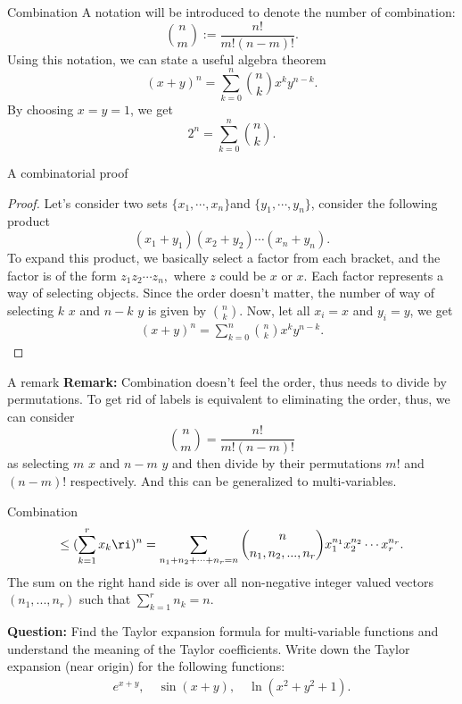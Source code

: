 \begin{frame}{Combination}
A notation will be introduced to denote the number of combination:
\[
\binom{n}{m}:=\frac{n!}{m!(n-m)!}.
\]
Using this notation, we can state a useful algebra theorem
$$
    (x+y)^n=\sum_{k=0}^n\binom{n}{k}x^ky^{n-k}.
$$
\et 
\bc By choosing $x=y=1$, we get 
$$
    2^n=\sum_{k=0}^n\binom{n}{ k}.
$$
\ec
\end{frame}

\begin{frame}{A combinatorial proof}
\begin{proof}
    Let's consider two sets $\{x_1,\cdots,x_n\}$and $\{y_1,\cdots,y_n\}$, consider the following product
    \[(x_1+y_1)(x_2+y_2)\cdots(x_n+y_n).\]
    To expand this product, we basically select a factor from each bracket, and the factor is of the form
    $
        z_1z_2\cdots z_n,
$
    where $z$ could be $x$ or $x$. Each factor represents a way of selecting objects. Since the order doesn't matter, the number of way of selecting $k$ $x$ and $n-k$ $y$ is given by $\binom{n}{k}$. Now, let all $x_i=x$ and $y_i=y$, we get
    \begin{align*}
        (x+y)^n=\sum_{k=0}^n\binom{n}{k}x^ky^{n-k}.
    \end{align*}
\end{proof}
    
\end{frame}

\begin{frame}{A remark}
	\textbf{Remark:} Combination doesn't feel the order, thus needs to divide by permutations. To get rid of labels is equivalent to eliminating the order, thus, we can consider
	\[\binom{n}{m}=\frac{n!}{m!(n-m)!}\]
	as selecting $m$ $x$ and $n-m$ $y$ and then divide by their permutations $m!$ and $(n-m)!$ respectively. And this can be generalized to multi-variables.
\end{frame}

\begin{frame}{Combination}
\label{multinomial thm}
\begin{align}
    \le(\sum_{k=1}^rx_k\ri)^n=\sum_{n_1+n_2+\cdots+n_r=n}\binom{n}{ n_1,n_2,...,n_r}x_1^{n_1}x_2^{n_2}\cdots x_r^{n_r}.
\end{align}
The sum on the right hand side is over all non-negative integer valued vectors $(n_1,...,n_r)$ such that $\sum_{k=1}^rn_k=n$. 
\et

\textbf{Question:} Find the Taylor expansion formula for multi-variable functions and understand the meaning of the Taylor coefficients. Write down the Taylor expansion (near origin) for the following functions:
\begin{align*}
    e^{x+y},\quad \sin(x+y),\quad \ln(x^2+y^2+1).
\end{align*}
\end{frame}
